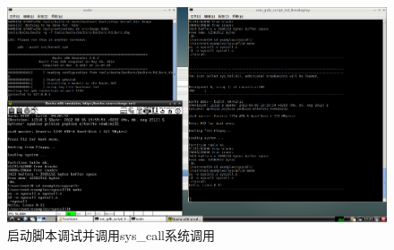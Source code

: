 \documentclass[]{report}
\begin{document}
\begin{figure}
    \centering
    \includegraphics[width=1\linewidth]{img/4}
    \caption[启动脚本调试并调用sys\_call系统调用]{启动脚本调试并调用sys\_call系统调用}
    \label{fig:4}
\end{figure}
\end{document}
